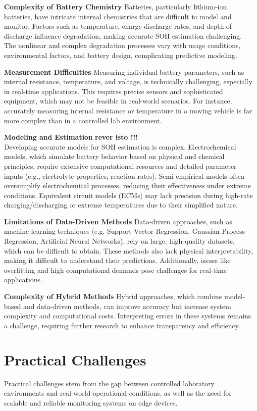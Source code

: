 \textbf{Complexity of Battery Chemistry}
Batteries, particularly lithium-ion batteries, have intricate internal chemistries that are difficult to model and monitor.
Factors such as temperature, charge-discharge rates, and depth of discharge influence degradation, making accurate SOH estimation challenging. 
The nonlinear and complex degradation processes vary with usage conditions, environmental factors, and battery design, complicating predictive modeling.

\textbf{Measurement Difficulties}
Measuring individual battery parameters, such as internal resistance, temperature, and voltage, is technically challenging, especially in real-time applications. 
This requires precise sensors and sophisticated equipment, which may not be feasible in real-world scenarios. 
For instance, accurately measuring internal resistance or temperature in a moving vehicle is far more complex than in a controlled lab environment.

\textbf{Modeling and Estimation}
\textbf{rever isto !!!} \\
Developing accurate models for SOH estimation is complex. 
Electrochemical models, which simulate battery behavior based on physical and chemical principles, require extensive computational resources and detailed parameter inputs (e.g., electrolyte properties, reaction rates). 
Semi-empirical models often oversimplify electrochemical processes, reducing their effectiveness under extreme conditions. Equivalent circuit models (ECMs) may lack precision during high-rate charging/discharging or extreme temperatures due to their simplified nature.

\textbf{Limitations of Data-Driven Methods}
Data-driven approaches, such as machine learning techniques (e.g. Support Vector Regression, Gaussian Process Regression, Artificial Neural Networks), rely on large, high-quality datasets, which can be difficult to obtain. 
These methods also lack physical interpretability, making it difficult to understand their predictions. 
Additionally, issues like overfitting and high computational demands pose challenges for real-time applications.

\textbf{Complexity of Hybrid Methods}
Hybrid approaches, which combine model-based and data-driven methods, can improve accuracy but increase system complexity and computational costs. 
Interpreting errors in these systems remains a challenge, requiring further research to enhance transparency and efficiency.

\section{Practical Challenges}
Practical challenges stem from the gap between controlled laboratory environments and real-world operational conditions, as well as the need for scalable and reliable monitoring systems on edge devices.

